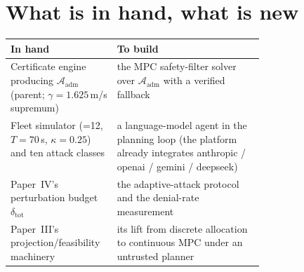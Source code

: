 \documentclass[11pt,a4paper]{article}
\newcommand{\adm}{\mathcal A_{\mathrm{adm}}}
\begin{document}
\section{What is in hand, what is new}
\begin{center}\small
\begin{tabularx}{\linewidth}{@{}P{0.42\linewidth}Y@{}}
\toprule
\textbf{In hand} & \textbf{To build} \\
\midrule
Certificate engine producing $\adm$ (parent; $\gamma=1.625$\,m/s supremum) &
the MPC safety-filter solver over $\adm$ with a verified fallback \\
Fleet simulator (=12, $T=70$\,s, $\kappa=0.25$) and ten attack
classes & a language-model agent in the planning loop (the platform already
integrates anthropic / openai / gemini / deepseek) \\
Paper~IV's perturbation budget $\delta_{\mathrm{tot}}$ &
the adaptive-attack protocol and the denial-rate measurement \\
Paper~III's projection/feasibility machinery & its lift from discrete allocation
to continuous MPC under an untrusted planner \\
\bottomrule
\end{tabularx}
\end{center}

\end{document}
